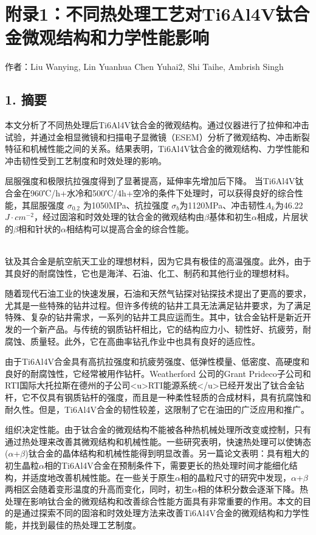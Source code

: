 \chapter{附录1：不同热处理工艺对Ti6Al4V钛合金微观结构和力学性能影响}
\begin{center}
	作者：Liu Wanying, Lin Yuanhua Chen Yuhai2, Shi Taihe, Ambrish Singh\\
\end{center}
\section*{1. 摘要}
本文分析了不同热处理后Ti6Al4V钛合金的微观结构。通过仪器进行了拉伸和冲击试验，并通过金相显微镜和扫描电子显微镜（ESEM）分析了微观结构、冲击断裂特征和机械性能之间的关系。结果表明，Ti6Al4V钛合金的微观结构、力学性能和冲击韧性受到工艺制度和时效处理的影响。

屈服强度和极限抗拉强度得到了显著提高，延伸率先增加后下降。
当Ti6Al4V钛合金在960℃/h+水冷和500℃/4h+空冷的条件下处理时，可以获得良好的综合性能，其屈服强度 $\sigma_{0.2}$ 为1050MPa、抗拉强度 $\sigma_b$为1120MPa、冲击韧性$A_k$为46.22 $J·cm^{-2}$，经过固溶和时效处理的钛合金的微观结构由$\beta$基体和初生$\alpha$相成，片层状的$\beta$相和针状的$\alpha$相结构可以提高合金的综合性能。

\noindent{}\\

钛及其合金是航空航天工业的理想材料，因为它具有极佳的高温强度。此外，由于其良好的耐腐蚀性，它也是海洋、石油、化工、制药和其他行业的理想材料。

随着现代石油工业的快速发展，石油和天然气钻探对钻探技术提出了更高的要求，尤其是一些特殊的钻井过程。但许多传统的钻井工具无法满足钻井要求，为了满足特殊、复杂的钻井需求，一系列的钻井工具应运而生。其中，钛合金钻杆是新近开发的一个新产品。与传统的钢质钻杆相比，它的结构应力小、韧性好、抗疲劳，耐腐蚀、质量轻。此外，它在高曲率钻孔作业中也具有良好的适应性。

由于Ti6Al4V合金具有高抗拉强度和抗疲劳强度、低弹性模量、低密度、高硬度和良好的耐腐蚀性，它经常被用作钻杆。Weatherford 公司的Grant Prideco子公司和RTI国际大托拉斯在德州的子公司<u>RTI能源系统</u>已经开发出了钛合金钻杆，它不仅具有钢质钻杆的强度，而且是一种柔性轻质的合成材料，具有抗腐蚀和耐久性。但是，Ti6Al4V合金的韧性较差，这限制了它在油田的广泛应用和推广。

组织决定性能。由于钛合金的微观结构不能被各种热机械处理所改变或控制，只有通过热处理来改善其微观结构和机械性能。一些研究表明，快速热处理可以使铸态($\alpha$+$\beta$)钛合金的晶体结构和机械性能得到明显改善。另一篇论文表明：具有粗大的初生晶粒$\alpha$相的Ti6Al4V合金在预制条件下，需要更长的热处理时间才能细化结构，并适度地改善机械性能。在一些关于原生$\alpha$相的晶粒尺寸的研究中发现，$\alpha$+$\beta$两相区会随着变形温度的升高而变化，同时，初生$\alpha$相的体积分数会逐渐下降。热处理在影响钛合金的微观结构和改善综合性能方面具有非常重要的作用。本文的目的是通过探索不同的固溶和时效处理方法来改善Ti6Al4V合金的微观结构和力学性能，并找到最佳的热处理工艺制度。

